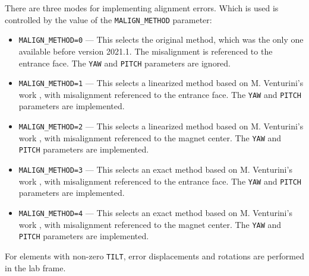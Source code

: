 There are three modes for implementing alignment errors. Which is used
is controlled by the value of the \verb|MALIGN_METHOD| parameter:
\begin{itemize}
\item \verb|MALIGN_METHOD=0| --- This selects the original method, which was
  the only one available before version 2021.1. The misalignment is
  referenced to the entrance face. The \verb|YAW| and \verb|PITCH| parameters
  are ignored.
\item \verb|MALIGN_METHOD=1| --- This selects a linearized method based on M. Venturini's
  work \cite{Venturini2021}, with misalignment referenced to the entrance face.
  The \verb|YAW| and \verb|PITCH| parameters are implemented.
\item \verb|MALIGN_METHOD=2| --- This selects a linearized method based on M. Venturini's
  work \cite{Venturini2021}, with misalignment referenced to the magnet center.
  The \verb|YAW| and \verb|PITCH| parameters are implemented.
\item \verb|MALIGN_METHOD=3| --- This selects an  exact method based on M. Venturini's
  work \cite{Venturini2021}, with misalignment referenced to the entrance face.
  The \verb|YAW| and \verb|PITCH| parameters are implemented.
\item \verb|MALIGN_METHOD=4| --- This selects an exact method based on M. Venturini's
  work \cite{Venturini2021}, with misalignment referenced to the magnet center.
  The \verb|YAW| and \verb|PITCH| parameters are implemented.
\end{itemize}

For elements with non-zero \verb|TILT|, error displacements and rotations are performed in the lab frame.
